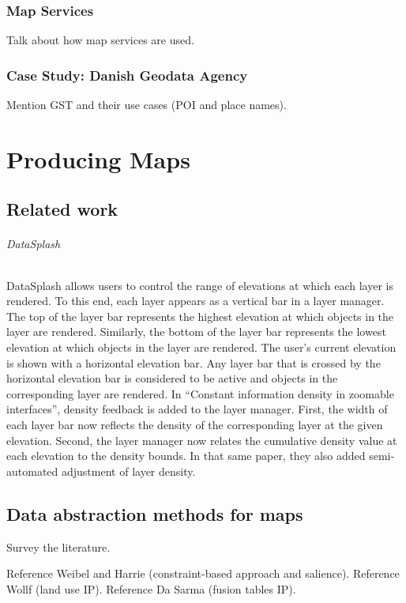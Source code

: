 \documentclass[11pt, oneside]{report}   	%
\begin{document}
\section{Map Services}
Talk about how map services are used.

\section{Case Study: Danish Geodata Agency}
Mention GST and their use cases (POI and place names).


\part{Producing Maps}

\chapter{Related work}
\paragraph{DataSplash} DataSplash allows users to control the range of elevations at which each layer is rendered. To this end, each layer appears as a vertical bar in a layer manager. The top of the layer bar represents the highest elevation at which objects in the layer are rendered. Similarly, the bottom of the layer bar represents the lowest elevation at which objects in the layer are rendered. The user's current elevation is shown with a horizontal elevation bar. Any layer bar that is crossed by the horizontal elevation bar is considered to be active and objects in the corresponding layer are rendered. In ``Constant information density in zoomable interfaces'', density feedback is added to the layer manager. First, the width of each layer bar now reflects the density of the corresponding layer at the given elevation. Second, the layer manager now relates the cumulative density value at each elevation to the density bounds. In that same paper, they also added semi-automated adjustment of layer density.


\chapter{Data abstraction methods for maps}
Survey the literature.

Reference Weibel and Harrie (constraint-based approach and salience). Reference Wollf (land use IP). Reference Da Sarma (fusion tables IP).
\end{document}
